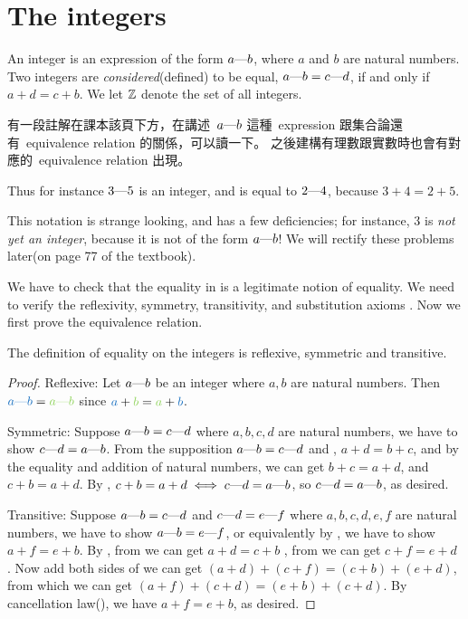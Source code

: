 \section{The integers} \label{sec 4.1}

\begin{definition} [Integers] \label{def 4.1.1}
An integer is an expression of the form \(a \text{---} b\), where \(a\) and \(b\) are natural numbers.
Two integers are \emph{considered}(defined) to be equal, \(a \text{---} b = c \text{---} d\), if and only if \(a + d = c + b\).
We let \(\mathbb{Z}\) denote the set of all integers.
\end{definition}

\begin{note}
 有一段註解在課本該頁下方，在講述\ \(a \text{---} b\) 這種\ expression 跟集合論還有\ equivalence relation 的關係，可以讀一下。
之後建構有理數跟實數時也會有對應的\ equivalence relation 出現。
\end{note}

Thus for instance \(3 \text{---} 5\) is an integer, and is equal to \(2 \text{---} 4\), because \(3 + 4 = 2 + 5\).

This notation is strange looking, and has a few deficiencies; for instance, \(3\) is \emph{not yet an integer}, because it is not of the form \(a \text{---} b\)! We will rectify these problems later(on page 77 of the textbook).

We have to check that the equality in  is a legitimate notion of equality.
We need to verify the reflexivity, symmetry, transitivity, and substitution axioms .
Now we first prove the equivalence relation.

\begin{additional corollary} \label{ac 4.1.1}
The definition of equality on the integers is reflexive, symmetric and transitive.
\end{additional corollary}

\begin{proof}
Reflexive: Let \(a \text{---} b\) be an integer where \(a, b\) are natural numbers.
Then \(\BLUE{a \M b} = \GREEN{a \M b}\) since \(\BLUE{a} + \GREEN{b} = \GREEN{a} + \BLUE{b}\).

Symmetric: Suppose \(a \text{---} b = c \text{---} d\) where \(a, b, c, d\) are natural numbers, we have to show \(c \text{---} d = a \text{---} b\).
From the supposition \(a \text{---} b = c \text{---} d\) and , \(a + d = b + c\), and by the equality and addition of natural numbers, we can get \(b + c = a + d\), and \(c + b = a + d\).
By , \(c + b = a + d \iff c \text{---} d = a \text{---} b\), so \(c \text{---} d = a \text{---} b\), as desired.

Transitive: Suppose \(a \text{---} b = c \text{---} d\)  and \(c \text{---} d = e \text{---} f\)  where \(a, b, c, d, e, f\) are natural numbers,
we have to show \(a \text{---} b = e \text{---} f\), or equivalently by , we have to show \(a + f = e + b\).
By , from  we can get \(a + d = c + b\) , from  we can get \(c + f = e + d\) .
Now add both sides of  we can get \((a + d) + (c + f) = (c + b) + (e + d)\), from which we can get \((a + f) + (c + d) = (e + b) + (c + d)\).
By cancellation law(), we have \(a + f = e + b\), as desired.
\end{proof}

